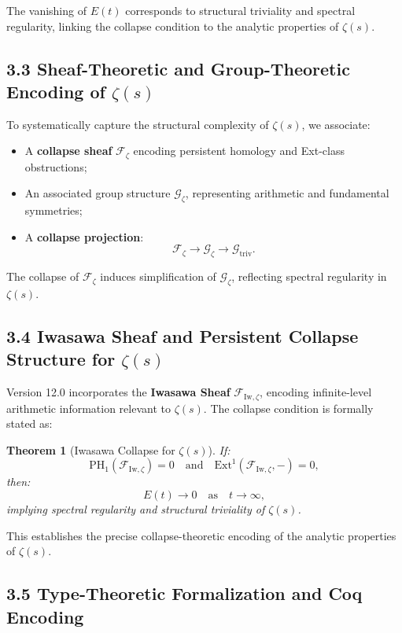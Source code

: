 \documentclass[11pt]{article}
\newtheorem{theorem}{Theorem}[section]
\begin{document}
The vanishing of $E(t)$ corresponds to structural triviality and spectral regularity, linking the collapse condition to the analytic properties of $\zeta(s)$.

\subsection*{3.3 Sheaf-Theoretic and Group-Theoretic Encoding of $\zeta(s)$}

To systematically capture the structural complexity of $\zeta(s)$, we associate:

\begin{itemize}
    \item A \textbf{collapse sheaf} $\mathcal{F}_{\zeta}$ encoding persistent homology and Ext-class obstructions;
    \item An associated group structure $\mathcal{G}_{\zeta}$, representing arithmetic and fundamental symmetries;
    \item A \textbf{collapse projection}:
    \[
    \mathcal{F}_{\zeta} \longrightarrow \mathcal{G}_{\zeta} \longrightarrow \mathcal{G}_{\mathrm{triv}}.
    \]
\end{itemize}

The collapse of $\mathcal{F}_{\zeta}$ induces simplification of $\mathcal{G}_{\zeta}$, reflecting spectral regularity in $\zeta(s)$.

\subsection*{3.4 Iwasawa Sheaf and Persistent Collapse Structure for $\zeta(s)$}

Version 12.0 incorporates the \textbf{Iwasawa Sheaf} $\mathcal{F}_{\mathrm{Iw}, \zeta}$, encoding infinite-level arithmetic information relevant to $\zeta(s)$. The collapse condition is formally stated as:

\begin{theorem}[Iwasawa Collapse for $\zeta(s)$]
If:
\[
\mathrm{PH}_1(\mathcal{F}_{\mathrm{Iw}, \zeta}) = 0 \quad \text{and} \quad \mathrm{Ext}^1(\mathcal{F}_{\mathrm{Iw}, \zeta}, -) = 0,
\]
then:
\[
E(t) \to 0 \quad \text{as} \quad t \to \infty,
\]
implying spectral regularity and structural triviality of $\zeta(s)$.
\end{theorem}

This establishes the precise collapse-theoretic encoding of the analytic properties of $\zeta(s)$.

\subsection*{3.5 Type-Theoretic Formalization and Coq Encoding}
\end{document}
